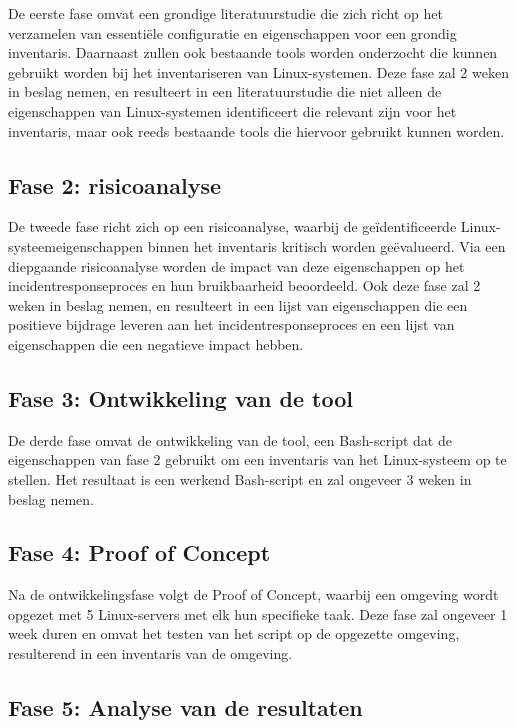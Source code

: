 De eerste fase omvat een grondige literatuurstudie die zich richt op het verzamelen van essenti\"ele configuratie en eigenschappen voor een grondig inventaris.
Daarnaast zullen ook bestaande tools worden onderzocht die kunnen gebruikt worden bij het inventariseren van Linux-systemen.
Deze fase zal 2 weken in beslag nemen, en resulteert in een literatuurstudie die niet alleen de  eigenschappen van Linux-systemen identificeert die relevant zijn voor het inventaris, maar ook reeds bestaande tools die hiervoor gebruikt kunnen worden.

\subsection{Fase 2: risicoanalyse}%
\label{sub:risico_analyse}

De tweede fase richt zich op een risicoanalyse, waarbij de ge\"identificeerde Linux-systeemeigenschappen binnen het inventaris kritisch worden ge\"evalueerd.
Via een diepgaande risicoanalyse worden de impact van deze eigenschappen op het incidentresponseproces en hun bruikbaarheid beoordeeld.
Ook deze fase zal 2 weken in beslag nemen, en resulteert in een lijst van eigenschappen die een positieve bijdrage leveren aan het incidentresponseproces en een lijst van eigenschappen die een negatieve impact hebben.

\subsection{Fase 3: Ontwikkeling van de tool}%
\label{sub:ontwikkeling_van_de_tool}

De derde fase omvat de ontwikkeling van de tool, een Bash-script dat de eigenschappen van fase 2 gebruikt om een inventaris van het Linux-systeem op te stellen.
Het resultaat is een werkend Bash-script en zal ongeveer 3 weken in beslag nemen.

\subsection{Fase 4: Proof of Concept}%
\label{sub:proof_of_concept}

Na de ontwikkelingsfase volgt de Proof of Concept, waarbij een omgeving wordt opgezet met 5 Linux-servers met elk hun specifieke taak.
Deze fase zal ongeveer 1 week duren en omvat het testen van het script op de opgezette omgeving, resulterend in een inventaris van de omgeving.

\subsection{Fase 5: Analyse van de resultaten}%
\label{sub:analyse_van_de_resultaten}

